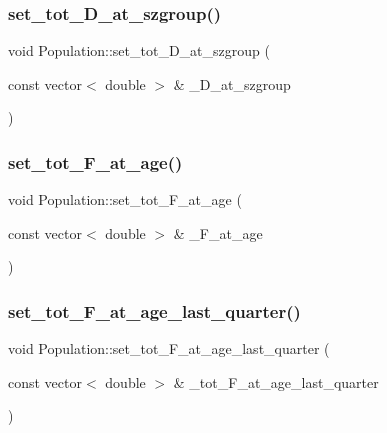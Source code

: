 \mbox{\label{class_population_a36b73df25c14a2b829a650cb1cb9a749}} 
\subsubsection{\texorpdfstring{set\_tot\_D\_at\_szgroup()}{set\_tot\_D\_at\_szgroup()}}
{\footnotesize\ttfamily void Population\+::set\+\_\+tot\+\_\+\+D\+\_\+at\+\_\+szgroup (\begin{DoxyParamCaption}\item[{const vector$<$ double $>$ \&}]{\+\_\+\+D\+\_\+at\+\_\+szgroup }\end{DoxyParamCaption})}

\mbox{\label{class_population_aa909babf9ec946ecd7c3cdd7ba3f682b}} 
\subsubsection{\texorpdfstring{set\_tot\_F\_at\_age()}{set\_tot\_F\_at\_age()}}
{\footnotesize\ttfamily void Population\+::set\+\_\+tot\+\_\+\+F\+\_\+at\+\_\+age (\begin{DoxyParamCaption}\item[{const vector$<$ double $>$ \&}]{\+\_\+\+F\+\_\+at\+\_\+age }\end{DoxyParamCaption})}

\mbox{\label{class_population_abeba579dcfb507b851e9289162aa66ac}} 
\subsubsection{\texorpdfstring{set\_tot\_F\_at\_age\_last\_quarter()}{set\_tot\_F\_at\_age\_last\_quarter()}}
{\footnotesize\ttfamily void Population\+::set\+\_\+tot\+\_\+\+F\+\_\+at\+\_\+age\+\_\+last\+\_\+quarter (\begin{DoxyParamCaption}\item[{const vector$<$ double $>$ \&}]{\+\_\+tot\+\_\+\+F\+\_\+at\+\_\+age\+\_\+last\+\_\+quarter }\end{DoxyParamCaption})}

